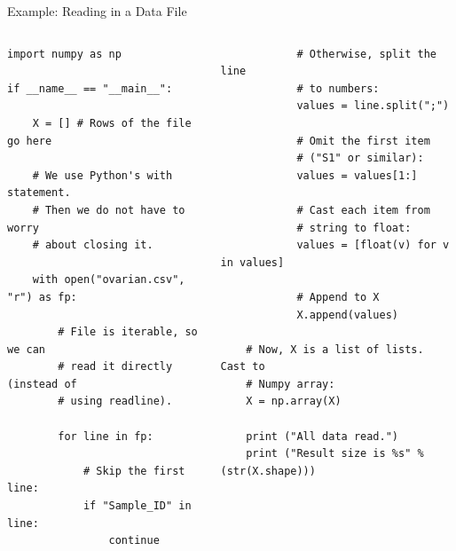 \documentclass[10pt, aspectratio=169]{beamer} %
\begin{document}
\begin{frame}[fragile,allowframebreaks=0.8]{Example: Reading in a Data File}
\begin{columns}
\begin{lstlisting}
import numpy as np

if __name__ == "__main__":

    X = [] # Rows of the file go here
    
    # We use Python's with statement. 
    # Then we do not have to worry 
    # about closing it.
    
    with open("ovarian.csv", "r") as fp:
        
        # File is iterable, so we can 
        # read it directly (instead of 
        # using readline).
        
        for line in fp:
            
            # Skip the first line:
            if "Sample_ID" in line:
                continue
\end{lstlisting}
\begin{lstlisting}
            # Otherwise, split the line
            # to numbers:
            values = line.split(";")
            
            # Omit the first item 
            # ("S1" or similar):
            values = values[1:]
            
            # Cast each item from
            # string to float:
            values = [float(v) for v in values]

            # Append to X
            X.append(values)            
            
    # Now, X is a list of lists. Cast to 
    # Numpy array:
    X = np.array(X)
    
    print ("All data read.")
    print ("Result size is %s" % (str(X.shape)))
\end{lstlisting}
\end{columns}
\end{frame}
\end{document}
